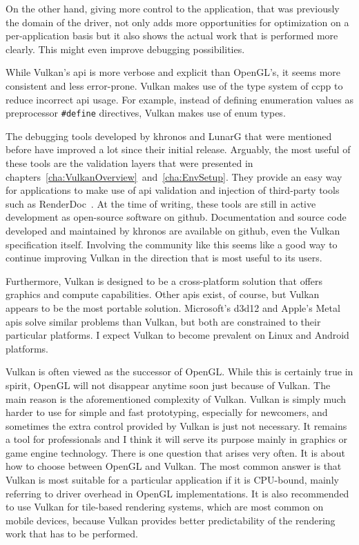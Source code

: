   On the other hand, giving more control to the application, that was previously the domain of the driver, not only adds more opportunities for optimization on a per-application basis but it also shows the actual work that is performed more clearly.
  This might even improve debugging possibilities.

  While Vulkan's \gls{api} is more verbose and explicit than OpenGL's, it seems more consistent and less error-prone.
  Vulkan makes use of the type system of \gls{ccpp} to reduce incorrect \gls{api} usage.
  For example, instead of defining enumeration values as preprocessor \lstinline{#define} directives, Vulkan makes use of enum types.

  The debugging tools developed by \gls{khronos} and LunarG that were mentioned before have improved a lot since their initial release.
  Arguably, the most useful of these tools are the validation layers that were presented in chapters~\ref{cha:VulkanOverview}~and~\ref{cha:EnvSetup}.
  They provide an easy way for applications to make use of \gls{api} validation and injection of third-party tools such as RenderDoc~\cite{renderdoc}.
  At the time of writing, these tools are still in active development as open-source software on \gls{github}.
  Documentation and source code developed and maintained by \gls{khronos} are available on \gls{github}, even the Vulkan specification itself.
  Involving the community like this seems like a good way to continue improving Vulkan in the direction that is most useful to its users.

  Furthermore, Vulkan is designed to be a cross-platform solution that offers graphics and compute capabilities.
  Other \glspl{api} exist, of course, but Vulkan appears to be the most portable solution.
  Microsoft's \gls{d3d12} and Apple's Metal \glspl{api} solve similar problems than Vulkan, but both are constrained to their particular platforms.
  I expect Vulkan to become prevalent on Linux and Android platforms.

  Vulkan is often viewed as the successor of OpenGL.
  While this is certainly true in spirit, OpenGL will not disappear anytime soon just because of Vulkan.
  The main reason is the aforementioned complexity of Vulkan.
  Vulkan is simply much harder to use for simple and fast prototyping, especially for newcomers, and sometimes the extra control provided by Vulkan is just not necessary.
  It remains a tool for professionals and I think it will serve its purpose mainly in graphics or game engine technology.
  There is one question that arises very often.
  It is about how to choose between OpenGL and Vulkan.
  The most common answer is that Vulkan is most suitable for a particular application if it is CPU-bound, mainly referring to driver overhead in OpenGL implementations.
  It is also recommended to use Vulkan for tile-based rendering systems, which are most common on mobile devices, because Vulkan provides better predictability of the rendering work that has to be performed.

